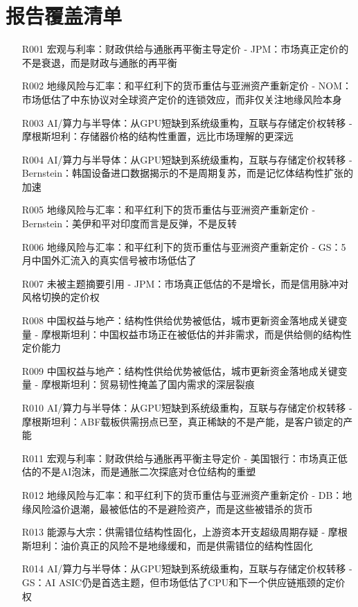 \documentclass[11pt]{ctexart}
\begin{document}
\section{报告覆盖清单}
\begin{itemize}
  \item [R001] 宏观与利率：财政供给与通胀再平衡主导定价 - JPM：市场真正定价的不是衰退，而是财政与通胀的再平衡
  \item [R002] 地缘风险与汇率：和平红利下的货币重估与亚洲资产重新定价 - NOM：市场低估了中东协议对全球资产定价的连锁效应，而非仅关注地缘风险本身
  \item [R003] AI/算力与半导体：从GPU短缺到系统级重构，互联与存储定价权转移 - 摩根斯坦利：存储器价格的结构性重置，远比市场理解的更深远
  \item [R004] AI/算力与半导体：从GPU短缺到系统级重构，互联与存储定价权转移 - Bernstein：韩国设备进口数据揭示的不是周期复苏，而是记忆体结构性扩张的加速
  \item [R005] 地缘风险与汇率：和平红利下的货币重估与亚洲资产重新定价 - Bernstein：美伊和平对印度而言是反弹，不是反转
  \item [R006] 地缘风险与汇率：和平红利下的货币重估与亚洲资产重新定价 - GS：5月中国外汇流入的真实信号被市场低估了
  \item [R007] 未被主题摘要引用 - JPM：市场真正低估的不是增长，而是信用脉冲对风格切换的定价权
  \item [R008] 中国权益与地产：结构性供给优势被低估，城市更新资金落地成关键变量 - 摩根斯坦利：中国权益市场正在被低估的并非需求，而是供给侧的结构性定价能力
  \item [R009] 中国权益与地产：结构性供给优势被低估，城市更新资金落地成关键变量 - 摩根斯坦利：贸易韧性掩盖了国内需求的深层裂痕
  \item [R010] AI/算力与半导体：从GPU短缺到系统级重构，互联与存储定价权转移 - 摩根斯坦利：ABF载板供需拐点已至，真正稀缺的不是产能，是客户锁定的产能
  \item [R011] 宏观与利率：财政供给与通胀再平衡主导定价 - 美国银行：市场真正低估的不是AI泡沫，而是通胀二次探底对仓位结构的重塑
  \item [R012] 地缘风险与汇率：和平红利下的货币重估与亚洲资产重新定价 - DB：地缘风险溢价退潮，最被低估的不是避险资产，而是这些被错杀的货币
  \item [R013] 能源与大宗：供需错位结构性固化，上游资本开支超级周期存疑 - 摩根斯坦利：油价真正的风险不是地缘缓和，而是供需错位的结构性固化
  \item [R014] AI/算力与半导体：从GPU短缺到系统级重构，互联与存储定价权转移 - GS：AI ASIC仍是首选主题，但市场低估了CPU和下一个供应链瓶颈的定价权

\end{itemize}
\end{document}
